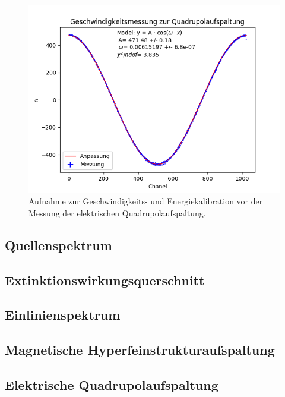 \documentclass[12pt,a4paper]{article}
\begin{document}
\begin{figure} [H]
\centering
\includegraphics[scale=0.8]{Bilder/Kalibration/Quadrupol.png}
\caption{Aufnahme zur Geschwindigkeits- und Energiekalibration vor der Messung der elektrischen Quadrupolaufspaltung.}
\end{figure}

\subsection{Quellenspektrum}
\subsection{Extinktionswirkungsquerschnitt}
\subsection{Einlinienspektrum}
\subsection{Magnetische Hyperfeinstrukturaufspaltung}
\subsection{Elektrische Quadrupolaufspaltung}
\end{document}
